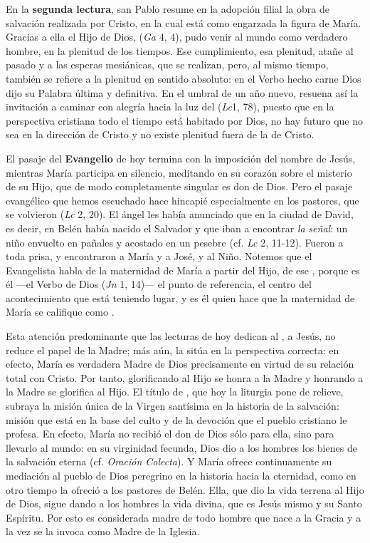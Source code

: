 \begin{body}
	En la \textbf{segunda lectura}, san Pablo resume en la adopción filial la obra de salvación realizada por Cristo, en la cual está como engarzada la figura de María. Gracias a ella el Hijo de Dios,  (\emph{Ga} 4, 4), pudo venir al mundo como verdadero hombre, en la plenitud de los tiempos. Ese cumplimiento, esa plenitud, atañe al pasado y a las esperas mesiánicas, que se realizan, pero, al mismo tiempo, también se refiere a la plenitud en sentido absoluto: en el Verbo hecho carne Dios dijo su Palabra última y definitiva. En el umbral de un año nuevo, resuena así la invitación a caminar con alegría hacia la luz del  (\emph{Lc}1, 78), puesto que en la perspectiva cristiana todo el tiempo está habitado por Dios, no hay futuro que no sea en la dirección de Cristo y no existe plenitud fuera de la de Cristo.
	
	El pasaje del \textbf{Evangelio} de hoy termina con la imposición del nombre de Jesús, mientras María participa en silencio, meditando en su corazón sobre el misterio de su Hijo, que de modo completamente singular es don de Dios. Pero el pasaje evangélico que hemos escuchado hace hincapié especialmente en los pastores, que se volvieron  (\emph{Lc} 2, 20). El ángel les había anunciado que en la ciudad de David, es decir, en Belén había nacido el Salvador y que iban a encontrar \emph{la} \emph{señal}: un niño envuelto en pañales y acostado en un pesebre (cf. \emph{Lc} 2, 11-12). Fueron a toda prisa, y encontraron a María y a José, y al Niño. Notemos que el Evangelista habla de la maternidad de María a partir del Hijo, de ese , porque es él ---el Verbo de Dios (\emph{Jn} 1, 14)--- el punto de referencia, el centro del acontecimiento que está teniendo lugar, y es él quien hace que la maternidad de María se califique como .
	
	Esta atención predominante que las lecturas de hoy dedican al , a Jesús, no reduce el papel de la Madre; más aún, la sitúa en la perspectiva correcta: en efecto, María es verdadera Madre de Dios precisamente en virtud de su relación total con Cristo. Por tanto, glorificando al Hijo se honra a la Madre y honrando a la Madre se glorifica al Hijo. El título de , que hoy la liturgia pone de relieve, subraya la misión única de la Virgen santísima en la historia de la salvación: misión que está en la base del culto y de la devoción que el pueblo cristiano le profesa. En efecto, María no recibió el don de Dios sólo para ella, sino para llevarlo al mundo: en su virginidad fecunda, Dios dio a los hombres los bienes de la salvación eterna (cf. \emph{Oración Colecta}). Y María ofrece continuamente su mediación al pueblo de Dios peregrino en la historia hacia la eternidad, como en otro tiempo la ofreció a los pastores de Belén. Ella, que dio la vida terrena al Hijo de Dios, sigue dando a los hombres la vida divina, que es Jesús mismo y su Santo Espíritu. Por esto es considerada madre de todo hombre que nace a la Gracia y a la vez se la invoca como Madre de la Iglesia.
	

\end{body}
